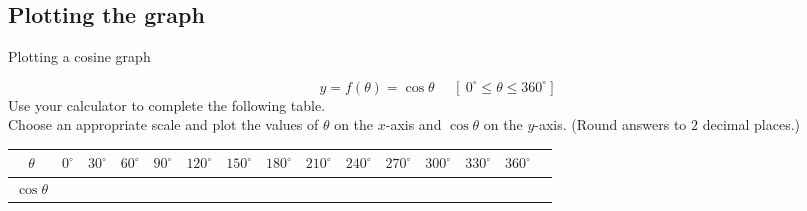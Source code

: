 \subsection*{Plotting the graph}
\begin{wex}
{Plotting a cosine graph}
{
\begin{equation*}
  y=f(\theta)=\cos  \theta~~~~~~[~0^{\circ} \leq \theta \leq 360^{\circ}]
\end{equation*}
Use your calculator to complete the following table. \\
Choose an appropriate scale and plot the values of
$\theta$ on the $x$-axis and $\cos\theta$ on the $y$-axis. (Round
answers to $2$ decimal places.)

\begin{table}[H]
\begin{center}
\begin{tabular}{|c|m{0.3cm}|m{0.3cm}|m{0.3cm}|m{0.5cm}|m{0.5cm}|m{0.5cm}|m{0.5cm}|m{0.5cm}|m{0.5cm}|m{0.5cm}|m{0.5cm}|m{0.5cm}|m{0.5cm}|} \hline

\footnotesize$\theta $&
\footnotesize$0^{\circ }$&
\footnotesize$30^{\circ }$&
\footnotesize$60^{\circ }$&
\footnotesize$90^{\circ }$&
\footnotesize$120^{\circ }$&
\footnotesize$150^{\circ }$&
\footnotesize$180^{\circ }$&
\footnotesize$210^{\circ }$&
\footnotesize$240^{\circ }$&
\footnotesize$270^{\circ }$&
\footnotesize$300^{\circ }$&
\footnotesize$330^{\circ }$&
\footnotesize$360^{\circ }$
\\ \hline

\footnotesize$\cos\theta $&
&
&
&
&
&
&
&
&
&
&
&
&
&

 \hline
\end{tabular}
\end{center}
\end{table}
}
{
\begin{table}[H]

\begin{center}


\end{center}
\end{table}}
\end{wex}
